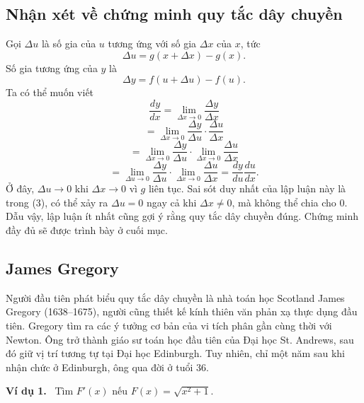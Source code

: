 \documentclass[12pt,a4paper]{article}
\newcommand{\ex}[1]{\par\medskip\noindent\textbf{Ví dụ #1.}\ }
\begin{document}
\subsection*{Nhận xét về chứng minh quy tắc dây chuyền}
Gọi $\Delta u$ là số gia của $u$ tương ứng với số gia $\Delta x$ của $x$, tức
\[\Delta u=g(x+\Delta x)-g(x).\]
Số gia tương ứng của $y$ là
\[\Delta y=f(u+\Delta u)-f(u).\]
Ta có thể muốn viết
\[\frac{dy}{dx}=\lim_{\Delta x\to0}\frac{\Delta y}{\Delta x}\]
\[=\lim_{\Delta x\to0}\frac{\Delta y}{\Delta u}\cdot\frac{\Delta u}{\Delta x}\tag{3}\]
\[=\lim_{\Delta x\to0}\frac{\Delta y}{\Delta u}\cdot\lim_{\Delta x\to0}\frac{\Delta u}{\Delta x}\]
\[=\lim_{\Delta u\to0}\frac{\Delta y}{\Delta u}\cdot\lim_{\Delta x\to0}\frac{\Delta u}{\Delta x}=\frac{dy}{du}\frac{du}{dx}.\]
Ở đây, $\Delta u\to0$ khi $\Delta x\to0$ vì $g$ liên tục. Sai sót duy nhất của lập luận này là trong (3), có thể xảy ra $\Delta u=0$ ngay cả khi $\Delta x\ne0$, mà không thể chia cho 0. Dẫu vậy, lập luận ít nhất cũng gợi ý rằng quy tắc dây chuyền đúng. Chứng minh đầy đủ sẽ được trình bày ở cuối mục.
\subsection*{James Gregory}
Người đầu tiên phát biểu quy tắc dây chuyền là nhà toán học Scotland James Gregory (1638–1675), người cũng thiết kế kính thiên văn phản xạ thực dụng đầu tiên. Gregory tìm ra các ý tưởng cơ bản của vi tích phân gần cùng thời với Newton. Ông trở thành giáo sư toán học đầu tiên của Đại học St. Andrews, sau đó giữ vị trí tương tự tại Đại học Edinburgh. Tuy nhiên, chỉ một năm sau khi nhận chức ở Edinburgh, ông qua đời ở tuổi 36.
\ex{1} Tìm $F'(x)$ nếu $F(x)=\sqrt{x^2+1}$.
\end{document}

